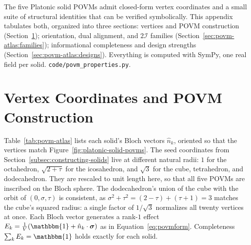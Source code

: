 \documentclass[11pt, oneside, openany]{scrbook}
\newcommand{\Id}{\mathbbm{1}}
\newcommand{\sigmavec}{\boldsymbol{\sigma}}
\newcommand{\Igroup}{\mathcal{I}}  %
\newcommand{\TwoI}{2\Igroup}
\newcommand{\phig}{\tau} %
\newcommand{\invphig}{\sigma} %
\begin{document}
The five Platonic solid POVMs admit closed-form vertex coordinates and a small suite of structural identities that can be verified symbolically. This appendix tabulates both, organized into three sections: vertices and POVM construction (Section~\ref{sec:povm-atlas:vertices}); orientation, dual alignment, and $\TwoI$ families (Section~\ref{sec:povm-atlas:families}); informational completeness and design strengths (Section~\ref{sec:povm-atlas:designs}). Everything is computed with SymPy, one real field per solid. \texttt{code/povm\_properties.py}.

\section{Vertex Coordinates and POVM Construction} \label{sec:povm-atlas:vertices}

Table~\ref{tab:povm-atlas} lists each solid's Bloch vectors $\hat n_k$, oriented so that the vertices match Figure~\ref{fig:platonic-solid-povms}. The seed coordinates from Section~\ref{subsec:constructing-solids} live at different natural radii: $1$ for the octahedron, $\sqrt{2+\phig}$ for the icosahedron, and $\sqrt{3}$ for the cube, tetrahedron, and dodecahedron. They are rescaled to unit length here, so that all five POVMs are inscribed on the Bloch sphere. The dodecahedron's union of the cube with the orbit of $(0,\invphig,\phig)$ is consistent, as $\invphig^2 + \phig^2 = (2-\phig) + (\phig+1) = 3$ matches the cube's squared radius: a single factor of $1/\sqrt{3}$ normalizes all twenty vertices at once. Each Bloch vector generates a rank-$1$ effect $E_k = \tfrac{1}{V}(\Id + \hat n_k \cdot \sigmavec)$ as in Equation~\eqref{eq:povmform}. Completeness $\sum_k E_k = \Id$ holds exactly for each solid.


\end{document}
